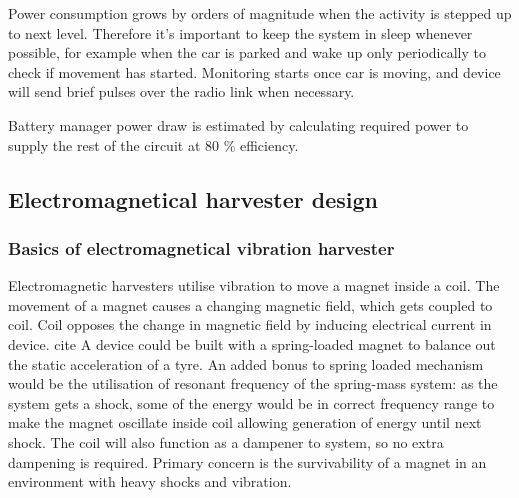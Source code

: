 \begin{table}[htb]
\caption{\label{power_consumption_table} Current and power consumption of system at different activity levels.}
\begin{center}
\end{center}
\end{table}

Power consumption grows by orders of magnitude when the activity is stepped up to next level. Therefore it's important to keep the system in sleep whenever possible, for example when the car is parked and wake up only periodically to check if movement has started. Monitoring starts once car is moving, and device will send brief pulses over the radio link when necessary.

Battery manager power draw is estimated by calculating required power to supply the rest of the circuit at 80 \% efficiency.


\subsection{Electromagnetical harvester design}
\subsubsection{Basics of electromagnetical vibration harvester}
Electromagnetic harvesters utilise vibration to move a magnet inside a coil. The movement of a magnet causes a changing magnetic field, which gets coupled to coil. Coil opposes the change in magnetic field by inducing electrical current in device. {\color{red} cite} A device could be built with a spring-loaded magnet to balance out the static acceleration of a tyre. An added bonus to spring loaded mechanism would be the utilisation of resonant frequency of the spring-mass system: as the system gets a shock, some of the energy would be in correct frequency range to make the magnet oscillate inside coil allowing generation of energy until next shock. The coil will also function  as a dampener to system, so no extra dampening is required. Primary concern is the survivability of a magnet in an environment with heavy shocks and vibration. 

